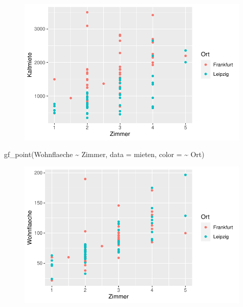 \documentclass[
  a4paper,
  DIV=11]{scrartcl}
\newenvironment{Shaded}{\begin{snugshade}}{\end{snugshade}}
\newcommand{\AttributeTok}[1]{\textcolor[rgb]{0.40,0.45,0.13}{#1}}
\newcommand{\FunctionTok}[1]{\textcolor[rgb]{0.28,0.35,0.67}{#1}}
\newcommand{\NormalTok}[1]{\textcolor[rgb]{0.00,0.23,0.31}{#1}}
\newcommand{\SpecialCharTok}[1]{\textcolor[rgb]{0.37,0.37,0.37}{#1}}
\begin{document}
\begin{figure}[H]

{\centering \includegraphics{Mietmodellierung_files/figure-pdf/unnamed-chunk-20-1.pdf}

}

\end{figure}

\begin{Shaded}
\begin{Highlighting}[]
\FunctionTok{gf\_point}\NormalTok{(Wohnflaeche }\SpecialCharTok{\textasciitilde{}}\NormalTok{ Zimmer, }\AttributeTok{data =}\NormalTok{ mieten, }\AttributeTok{color =} \SpecialCharTok{\textasciitilde{}}\NormalTok{ Ort)}
\end{Highlighting}
\end{Shaded}

\begin{figure}[H]

{\centering \includegraphics{Mietmodellierung_files/figure-pdf/unnamed-chunk-20-2.pdf}

}

\end{figure}
\end{document}
